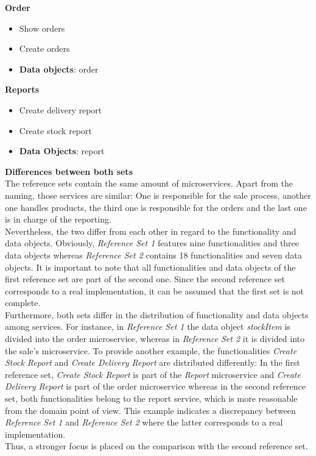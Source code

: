\begin{multicols}{2}
	\textbf{Order}
	\begin{flushleft}
		\begin{itemize}[noitemsep]
			\item Show orders
			\item Create orders
			\item \textbf{Data objects}: order
		\end{itemize}
	\end{flushleft}
	
	
    	\vfill
	\columnbreak
	\textbf{Reports}
	\begin{flushleft}
		\begin{itemize}[noitemsep]
			\item Create delivery report
			\item Create stock report
			\item \textbf{Data Objects}: report  
	
		\end{itemize}
	\end{flushleft}
\end{multicols}





\noindent
\textbf{Differences between both sets} \\
The reference sets contain the same amount of microservices. Apart from the naming, those services are similar: One is responsible for the sale process, another one handles products, the third one is responsible for the orders and the last one is in charge of the reporting. \\
Nevertheless, the two differ from each other in regard to the functionality and data objects. Obviously, \textit{Reference Set 1} features nine functionalities and three data objects whereas \textit{Reference Set 2} contains 18 functionalities and seven data objects. It is important to note that all functionalities and data objects of the first reference set are part of the second one. Since the second reference set corresponds to a real implementation, it can be assumed that the first set is not complete. \\
Furthermore, both sets differ in the distribution of functionality and data objects among services. For instance, in \textit{Reference Set 1} the data object \textit{stockItem} is divided into the order microservice, whereas in \textit{Reference Set 2} it is divided into the sale's microservice. To provide another example, the functionalities \textit{Create Stock Report} and \textit{Create Delivery Report} are distributed differently: In the first reference set, \textit{Create Stock Report} is part of the \textit{Report} microservice and \textit{Create Delivery Report} is part of the order microservice whereas in the second reference set, both functionalities belong to the report service, which is more reasonable from the domain point of view. This example indicates a discrepancy between \textit{Reference Set 1} and \textit{Reference Set 2} where the latter corresponds to a real implementation. \\
Thus, a stronger focus is placed on the comparison with the second reference set.




